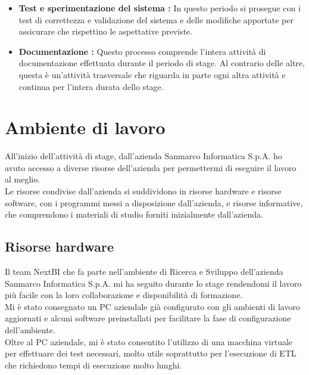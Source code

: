 \begin{itemize}
\item \textbf{Test e sperimentazione del sistema :}
In questo periodo si prosegue con i test di correttezza e validazione del sistema e delle modifiche apportate per assicurare che rispettino le aspettative previste.

\item \textbf{Documentazione :} 
Questo  processo comprende l'intera attività di documentazione effettuata durante il periodo di stage. Al contrario delle altre, questa è un'attività trasversale che riguarda in parte ogni altra attività e continua per l'intera durata dello stage. 
\end{itemize}




\section{Ambiente di lavoro}

All'inizio dell'attività di stage, dall'azienda Sanmarco Informatica S.p.A. ho avuto accesso a diverse risorse dell'azienda per permettermi di eseguire il lavoro al meglio. \\
Le risorse condivise dall'azienda si suddividono in risorse hardware e risorse software, con i programmi messi a disposizione dall'azienda, e risorse informative, che comprendono i materiali di studio forniti inizialmente dall'azienda. 

\subsection{Risorse hardware}

Il team NextBI che fa parte nell'ambiente di Ricerca e Sviluppo dell'azienda Sanmarco Informatica S.p.A. mi ha seguito durante lo stage rendendomi il lavoro più facile con la loro collaborazione e disponibilità di formazione. \\

Mi è stato consegnato un PC aziendale già configurato con gli ambienti di lavoro aggiornati e alcuni software preinstallati per facilitare la fase di configurazione dell'ambiente. \\
Oltre al PC aziendale, mi è stato consentito l'utilizzo di una macchina virtuale per effettuare dei test necessari, molto utile soprattutto per l'esecuzione di ETL che richiedono tempi di esecuzione molto lunghi. 
